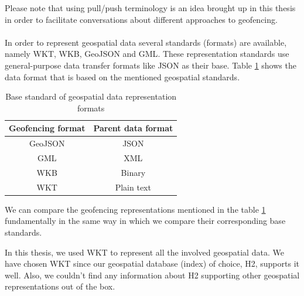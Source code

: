\documentclass[a4]{report}
\begin{document}
    Please note that using pull/push terminology is an idea brought up in this thesis in order to facilitate
    conversations about different approaches to geofencing.

    \paragraph{}
    In order to represent geospatial data several standards (formats) are available, namely WKT\cite{WKT}, WKB\cite{wkb},
    GeoJSON\cite{geoJson} and GML\cite{gml}.
    These representation standards use general-purpose data transfer formats like JSON as their base.
    Table \ref{table:geofencing-formats} shows the data format that is based on the mentioned geospatial standards.

    \begin{table}[h!]
        \centering
        \begin{tabular}{|c|c|}
            \hline
            Geofencing format & Parent data format \\
            \hline
            GeoJSON           & JSON               \\
            GML               & XML                \\
            WKB               & Binary             \\
            WKT               & Plain text         \\
            \hline
        \end{tabular}
        \caption{Base standard of geospatial data representation formats}
        \label{table:geofencing-formats}
    \end{table}

    We can compare the geofencing representations mentioned in the table \ref{table:geofencing-formats} fundamentally
    in the same way in which we compare their corresponding base standards.

    In this thesis, we used WKT to represent all the involved geospatial data.
    We have chosen WKT since our geospatial database (index) of choice, H2\cite{h2}, supports it well.
    Also, we couldn't find any information about H2 supporting other geospatial representations out of the box.
\end{document}
